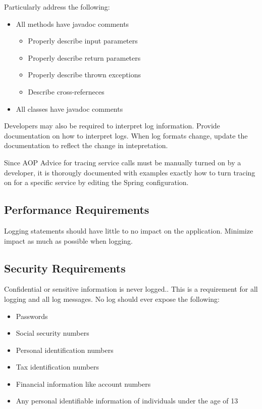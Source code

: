 \documentclass[12pt]{report}
\begin{document}
Particularly address the following:
\begin{itemize} 
\item All methods have javadoc comments
  \begin{itemize} 
  \item Properly describe input parameters
  \item Properly describe return parameters
  \item Properly describe thrown exceptions
  \item Describe cross-referneces
  \end{itemize}
\item All classes have javadoc comments
\end{itemize}

Developers may also be required to interpret log information. Provide documentation on how to interpret logs. When log formats
change, update the documentation to reflect the change in intepretation.

Since AOP Advice for tracing service calls must be manually turned on by a developer, it is thorougly documented with examples
exactly how to turn tracing on for a specific service by editing the Spring configuration.

\subsection{Performance Requirements}
Logging statements should have little to no impact on the application. Minimize impact as much as possible when logging.

\subsection{Security Requirements}
Confidential or sensitive information is never logged.. This is a requirement for all logging and all log messages. No log should ever
expose the following:
\begin{itemize}
  \item Passwords
  \item Social security numbers
  \item Personal identification numbers
  \item Tax identification numbers
  \item Financial information like account numbers 
  \item Any personal identifiable information of individuals under the age of 13
\end{itemize}
\end{document}
